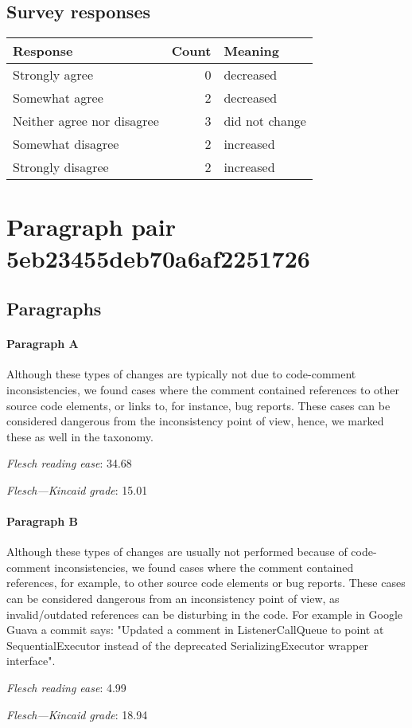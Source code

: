 \subsection{Survey responses}
\begin{tabular}{lrl}
\toprule
          \textbf{Response} &  \textbf{Count} & \textbf{Meaning} \\
\midrule
             Strongly agree &               0 &        decreased \\
             Somewhat agree &               2 &        decreased \\
 Neither agree nor disagree &               3 &   did not change \\
          Somewhat disagree &               2 &        increased \\
          Strongly disagree &               2 &        increased \\
\bottomrule
\end{tabular}

\section{Paragraph pair 5eb23455deb70a6af2251726}
\subsection{Paragraphs}
\paragraph{Paragraph A}
Although these types of changes are typically not due to code-comment inconsistencies, we found cases where the comment contained references to other source code elements, or links to, for instance, bug reports. These cases can be considered dangerous from the inconsistency point of view, hence, we marked these as well in the taxonomy.\par\medskip
\emph{Flesch reading ease}: 34.68\par
\emph{Flesch---Kincaid grade}: 15.01

\paragraph{Paragraph B}
Although these types of changes are usually not performed because of code-comment inconsistencies, we found cases where the comment contained references, for example, to other source code elements or bug reports. These cases can be considered dangerous from an inconsistency point of view, as invalid/outdated references can be disturbing in the code. For example in Google Guava a commit says: "Updated a comment in ListenerCallQueue to point at SequentialExecutor instead of the deprecated SerializingExecutor wrapper interface".\par\medskip
\emph{Flesch reading ease}: 4.99\par
\emph{Flesch---Kincaid grade}: 18.94

